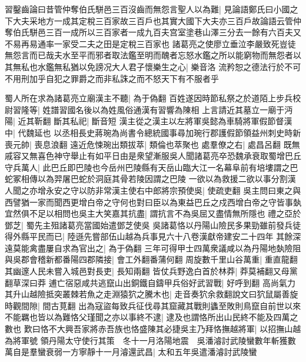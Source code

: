 習鑿齒論曰昔管仲奪伯氏駢邑三百沒齒而無怨言聖人以為難|{
	見論語鄭氏曰小國之下大夫采地方一成其定稅三百家故三百戶也其實大國下大夫亦三百戶故論語云管仲奪伯氏駢邑三百一成所以三百家者一成九百夫宫室塗巷山澤三分去一餘有六百夫又不易再易通率一家受二夫之田是定稅三百家也}
諸葛亮之使廖立垂泣李嚴致死豈徒無怨言而已哉夫水至平而邪者取法鑑至明而醜者忘怒水鑑之所以能窮物而無怨者以其無私也水鑑無私猶以免謗况大人君子懷樂生之心|{
	樂音洛}
流矜恕之德法行於不可不用刑加乎自犯之罪爵之而非私誅之而不怒天下有不服者乎

蜀人所在求為諸葛亮立廟漢主不聽|{
	為于偽翻}
百姓遂因時節私祭之於道陌上步兵校尉習隆等|{
	姓譜習國名後以為姓風俗通漢有習響為陳相}
上言請近其墓立一廟于沔陽|{
	近其靳翻}
斷其私祀|{
	斷音短}
漢主從之漢主以左將軍吳懿為車騎將軍假節督漢中|{
	代魏延也}
以丞相長史蔣琬為尚書令總統國事尋加琬行郡護假節領益州刺史時新喪元帥|{
	喪息浪翻}
遠近危悚琬出類拔萃|{
	類倫也萃聚也}
處羣僚之右|{
	處昌呂翻}
既無戚容又無喜色神守舉止有如平日由是衆望漸服吳人聞諸葛亮卒恐魏承衰取蜀增巴丘守兵萬人|{
	此巴丘即巴陵也今岳州巴陵縣有天岳山臨大江一名幕阜前有培塿謂之巴蛇冢相傳以為羿屠巴蛇於洞庭其骨若陵因謂之巴陵}
一欲以為救援二欲以事分割漢人聞之亦增永安之守以防非常漢主使右中郎將宗預使吳|{
	使疏吏翻}
吳主問曰東之與西譬猶一家而聞西更增白帝之守何也對曰臣以為東益巴丘之戍西增白帝之守皆事埶宜然俱不足以相問也吳主大笑嘉其抗盡|{
	謂抗言不為吳屈又盡情無所隱也}
禮之亞於鄧芝|{
	蜀先主殂諸葛亮當國始遣鄧芝使吳}
吳諸葛恪以丹陽山險民多果勁雖前發兵徒得外縣平民而已|{
	陸遜先嘗部伍山越為兵事見六十八卷漢獻帝建安二十四年}
其餘深遠莫能禽盡屢自求為官出之|{
	為于偽翻}
三年可得甲士四萬衆議咸以為丹陽地埶險阻與吳郡會稽新都番陽四郡隣接|{
	會工外翻番蒲何翻}
周旋數千里山谷萬重|{
	重直龍翻}
其幽邃人民未嘗入城邑對長吏|{
	長知兩翻}
皆仗兵野逸白首於林莽|{
	莽莫補翻又母黨翻草深曰莽}
逋亡宿惡咸共逃竄山出銅鐵自鑄甲兵俗好武習戰|{
	好呼到翻}
高尚氣力其升山越險抵突叢棘若魚之走淵猿狖之騰木也|{
	走音奏狖余救翻說文曰狖鼠屬善旋}
時觀間隙|{
	間古莧翻}
出為寇盜每致兵征伐尋其窟藏其戰則蠭至敗則鳥竄自前世以來不能羈也皆以為難恪父瑾聞之亦以事終不逮|{
	逮及也謂恪所出山民終不能及四萬之數也}
歎曰恪不大興吾家將赤吾族也恪盛陳其必捷吳主乃拜恪撫越將軍|{
	以招撫山越為將軍號}
領丹陽太守使行其策　冬十一月洛陽地震　吳潘濬討武陵蠻數年斬獲數萬自是羣蠻衰弱一方寧靜十一月濬還武昌|{
	太和五年吳遣潘濬討武陵蠻}


